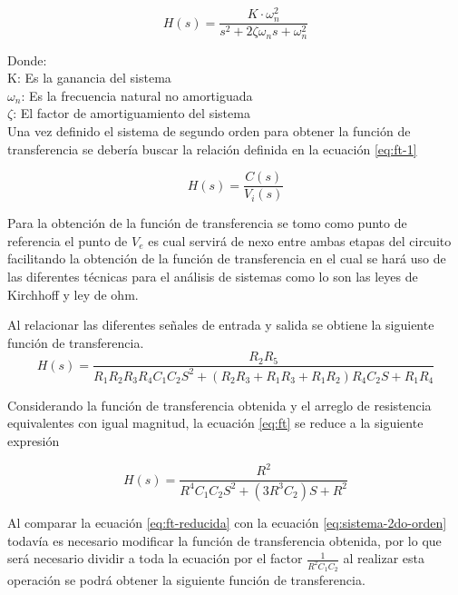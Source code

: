 \documentclass[conference]{IEEEtran}
\begin{document}
	\begin{equation}
		H(s) = \frac{K \cdot \omega_n^2}{s^2 + 2\zeta\omega_n s + \omega_n^2}
		\label{eq:sistema-2do-orden}
	\end{equation}
	
	Donde: \\ 
	K: Es la ganancia del sistema \\
	$\omega_n$: Es la frecuencia natural no amortiguada \\
	$\zeta$: El factor de amortiguamiento del sistema \\
	
	Una vez definido el sistema de segundo orden para obtener la función de transferencia se debería buscar la relación definida en la ecuación \ref{eq:ft-1}
	
	\begin{equation}
		H(s) = \frac{C(s)}{V_i(s)}
		\label{eq:ft-1}
	\end{equation}
	
	Para la obtención de la función de transferencia se tomo como punto de referencia el punto de $V_e$ es cual servirá de nexo entre ambas etapas del circuito facilitando la obtención de la función de transferencia en el cual se hará uso de las diferentes técnicas para el análisis de sistemas como lo son las leyes de Kirchhoff y ley de ohm.
	
	Al relacionar las diferentes señales de entrada y salida se obtiene la siguiente función de transferencia.
	{\small
	\begin{equation}
		H(s) = \frac{R_2 R_5}{R_1 R_2 R_3 R_4 C_1 C_2 S^2 + (R_2 R_3 + R_1 R_3 + R_1 R_2)R_4 C_2 S + R_1 R_4}
		\label{eq:ft}
	\end{equation}
	}	
	
	Considerando la función de transferencia obtenida y el arreglo de resistencia equivalentes con igual magnitud, la ecuación \ref{eq:ft} se reduce a la siguiente expresión
	
	\begin{equation}
		H(s) = \frac{R^2}{R^4 C_1 C_2 S^2 + (3R^3 C_2)S + R^2}
		\label{eq:ft-reducida}
	\end{equation}
	
	Al comparar la ecuación \ref{eq:ft-reducida} con la ecuación \ref{eq:sistema-2do-orden} todavía es necesario modificar la función de transferencia obtenida, por lo que será necesario dividir a toda la ecuación por el factor $\frac{1}{R^2 C_1 C_2}$ al realizar esta operación se podrá obtener la siguiente función de transferencia.
	
\end{document}
